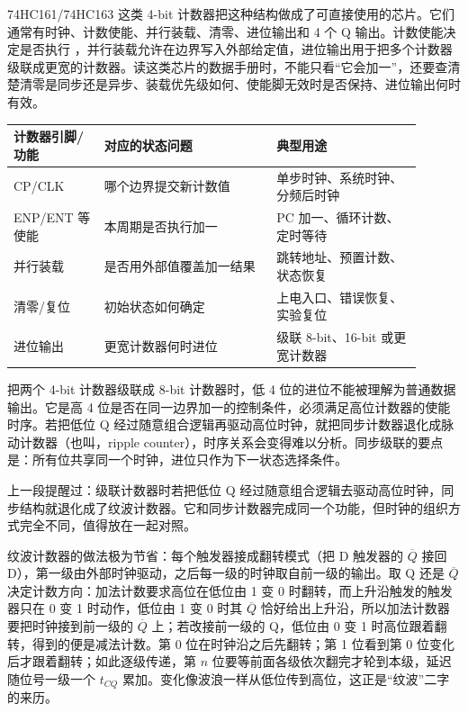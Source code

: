 74HC161/74HC163 这类 4-bit 计数器把这种结构做成了可直接使用的芯片。它们通常有时钟、计数使能、并行装载、清零、进位输出和 4 个 Q 输出。计数使能决定是否执行 ，并行装载允许在边界写入外部给定值，进位输出用于把多个计数器级联成更宽的计数器。读这类芯片的数据手册时，不能只看“它会加一”，还要查清楚清零是同步还是异步、装载优先级如何、使能脚无效时是否保持、进位输出何时有效。

\begin{longtable}{L{0.2\linewidth}L{0.38\linewidth}L{0.32\linewidth}}
\toprule
计数器引脚/功能 & 对应的状态问题 & 典型用途 \\
\midrule
CP/CLK & 哪个边界提交新计数值 & 单步时钟、系统时钟、分频后时钟 \\\tablerowrule
ENP/ENT 等使能 & 本周期是否执行加一 & PC 加一、循环计数、定时等待 \\\tablerowrule
并行装载 & 是否用外部值覆盖加一结果 & 跳转地址、预置计数、状态恢复 \\\tablerowrule
清零/复位 & 初始状态如何确定 & 上电入口、错误恢复、实验复位 \\\tablerowrule
进位输出 & 更宽计数器何时进位 & 级联 8-bit、16-bit 或更宽计数器 \\
\bottomrule
\end{longtable}

把两个 4-bit 计数器级联成 8-bit 计数器时，低 4 位的进位不能被理解为普通数据输出。它是高 4 位是否在同一边界加一的控制条件，必须满足高位计数器的使能时序。若把低位 Q 经过随意组合逻辑再驱动高位时钟，就把同步计数器退化成脉动计数器（也叫，ripple counter），时序关系会变得难以分析。同步级联的要点是：所有位共享同一个时钟，进位只作为下一状态选择条件。


上一段提醒过：级联计数器时若把低位 Q 经过随意组合逻辑去驱动高位时钟，同步结构就退化成了纹波计数器。它和同步计数器完成同一个功能，但时钟的组织方式完全不同，值得放在一起对照。

纹波计数器的做法极为节省：每个触发器接成翻转模式（把 D 触发器的 $\overline{Q}$ 接回 D），第一级由外部时钟驱动，之后每一级的时钟取自前一级的输出。取 Q 还是 $\overline{Q}$ 决定计数方向：加法计数要求高位在低位由 1 变 0 时翻转，而上升沿触发的触发器只在 0 变 1 时动作，低位由 1 变 0 时其 $\overline{Q}$ 恰好给出上升沿，所以加法计数器要把时钟接到前一级的 $\overline{Q}$ 上；若改接前一级的 Q，低位由 0 变 1 时高位跟着翻转，得到的便是减法计数。第 0 位在时钟沿之后先翻转；第 1 位看到第 0 位变化后才跟着翻转；如此逐级传递，第 $n$ 位要等前面各级依次翻完才轮到本级，延迟随位号一级一个 $t_{CQ}$ 累加。变化像波浪一样从低位传到高位，这正是“纹波”二字的来历。

